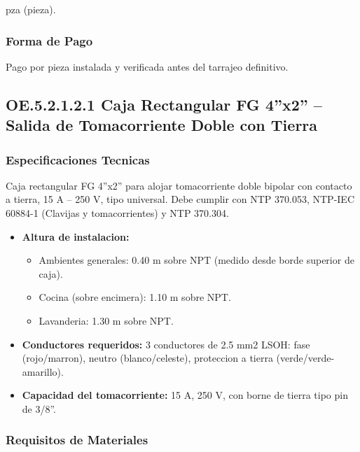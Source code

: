 pza (pieza).

\subsubsection{Forma de Pago}

Pago por pieza instalada y verificada antes del tarrajeo definitivo.

\subsection{OE.5.2.1.2.1 Caja Rectangular FG 4''x2'' -- Salida de Tomacorriente Doble con Tierra}

\subsubsection{Especificaciones Tecnicas}

Caja rectangular FG 4''x2'' para alojar tomacorriente doble bipolar con contacto a tierra, 15 A -- 250 V, tipo universal. Debe cumplir con NTP 370.053, NTP-IEC 60884-1 (Clavijas y tomacorrientes) y NTP 370.304.

\begin{itemize}[nosep]
  \item \textbf{Altura de instalacion:}
  \begin{itemize}
    \item Ambientes generales: 0.40 m sobre NPT (medido desde borde superior de caja).
    \item Cocina (sobre encimera): 1.10 m sobre NPT.
    \item Lavanderia: 1.30 m sobre NPT.
  \end{itemize}
  \item \textbf{Conductores requeridos:} 3 conductores de 2.5 mm2 LSOH: fase (rojo/marron), neutro (blanco/celeste), proteccion a tierra (verde/verde-amarillo).
  \item \textbf{Capacidad del tomacorriente:} 15 A, 250 V, con borne de tierra tipo pin de 3/8''.
\end{itemize}

\subsubsection{Requisitos de Materiales}

